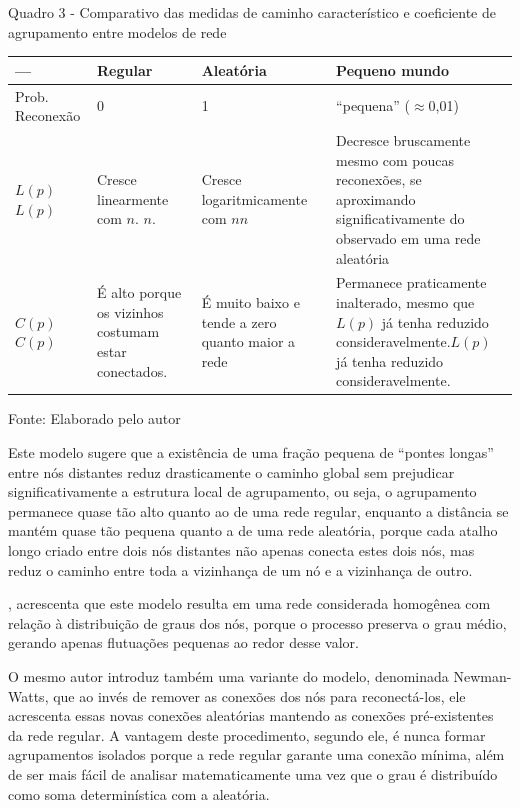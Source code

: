 \documentclass[12pt,oneside,a4paper,brazil,sumario=tradicional]{abntex2}
\begin{document}
Quadro 3 - Comparativo das medidas de caminho característico e coeficiente de agrupamento entre modelos de rede

\begin{center}
\begin{tabular}{p{4cm}|p{4cm}|p{4cm}|p{4cm}}
\toprule
--- & Regular & Aleatória & Pequeno mundo \\
\midrule
Prob. Reconexão & 0 & 1 & “pequena” ($\approx$0,01) \\
$L(p)$$L(p)$ & Cresce linearmente com $n$. $n$. & Cresce logaritmicamente com $n$$n$ & Decresce bruscamente mesmo com poucas reconexões, se aproximando significativamente do observado em uma rede aleatória \\
$C(p)$$C(p)$ & É alto porque os vizinhos costumam estar conectados. & É muito baixo e tende a zero quanto maior a rede & Permanece praticamente inalterado, mesmo que $L(p)$ já tenha reduzido consideravelmente.$L(p)$ já tenha reduzido consideravelmente. \\
\bottomrule
\end{tabular}
\end{center}
Fonte: Elaborado pelo autor

Este modelo sugere que a existência de uma fração pequena de “pontes longas” entre nós distantes reduz drasticamente o caminho global sem prejudicar significativamente a estrutura local de agrupamento, ou seja, o agrupamento permanece quase tão alto quanto ao de uma rede regular, enquanto a distância se mantém quase tão pequena quanto a de uma rede aleatória, porque cada atalho longo criado entre dois nós distantes não apenas conecta estes dois nós, mas reduz o caminho entre toda a vizinhança de um nó e a vizinhança de outro.

, acrescenta que este modelo resulta em uma rede considerada homogênea com relação à distribuição de graus dos nós, porque o processo preserva o grau médio, gerando apenas flutuações pequenas ao redor desse valor.

O mesmo autor introduz também uma variante do modelo, denominada Newman-Watts, que ao invés de remover as conexões dos nós para reconectá-los, ele acrescenta essas novas conexões aleatórias mantendo as conexões pré-existentes da rede regular. A vantagem deste procedimento, segundo ele, é nunca formar agrupamentos isolados porque a rede regular garante uma conexão mínima, além de ser mais fácil de analisar matematicamente uma vez que o grau é distribuído como soma determinística com a aleatória.
\end{document}
